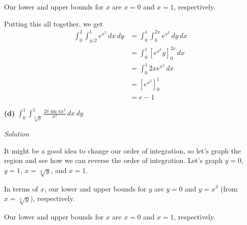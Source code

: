\documentclass{article}
\newcommand{\lrb}[1]{\left[ #1 \right]}
\newcommand{\Solution}{\textit{Solution}}
\begin{document}
Our lower and upper bounds for $x$ are $x=0$ and $x=1$, respectively.

Putting this all together, we get
\begin{align*}
    \int_0^2\int_{y/2}^1 e^{x^2}\,dx\,dy&=\int_0^1\int_{0}^{2x} e^{x^2}\,dy\,dx\\
    &=\int_0^1 \lrb{e^{x^2}y}_{0}^{2x}\,dx\\
    &=\int_0^1 2xe^{x^2}\,dx\\
    &=\lrb{e^{x^2}}_0^1\\
    &=\boxed{e-1}
\end{align*}
{}\textbf{(d)} $\displaystyle \int_0^1\int_{\sqrt[3]{y}}^1\frac{2\pi\sin\pi x^2}{x^2}\,dx\,dy$

\Solution

It might be a good idea to change our order of integration, so let's graph the region and see how we can reverse the order of integration. Let's graph $y=0$, $y=1$, $x=\sqrt[3]{y}$, and $x=1$.

\begin{center}
\end{center}
In terms of $x$, our lower and upper bounds for $y$ are $y=0$ and $y=x^3$ (from $x=\sqrt[3]{y}$), respectively.

Our lower and upper bounds for $x$ are $x=0$ and $x=1$, respectively.
\end{document}
